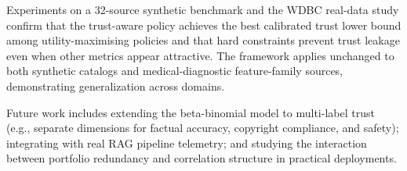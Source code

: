 \documentclass[runningheads]{llncs}
\begin{document}
Experiments on a 32-source synthetic benchmark and the WDBC real-data
study confirm that the trust-aware policy achieves the best calibrated
trust lower bound among utility-maximising policies and that hard
constraints prevent trust leakage even when other metrics appear
attractive.  The framework applies unchanged to both synthetic catalogs
and medical-diagnostic feature-family sources, demonstrating
generalization across domains.

Future work includes extending the beta-binomial model to multi-label
trust (e.g., separate dimensions for factual accuracy, copyright
compliance, and safety); integrating with real RAG pipeline telemetry;
and studying the interaction between portfolio redundancy and correlation
structure in practical deployments.


\end{document}
